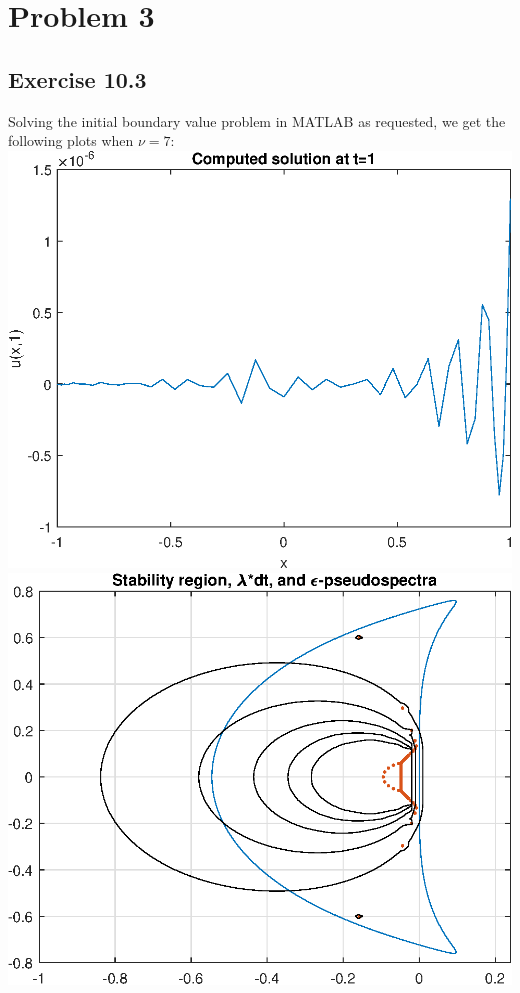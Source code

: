 \documentclass{article}
\begin{document}
\section{Problem 3}
\subsection{Exercise 10.3}
Solving the initial boundary value problem in MATLAB as requested, we get the following plots when $\nu=7$:\\
\includegraphics[scale=0.8]{sol7.eps}\\
\includegraphics[scale=0.8]{reg7.eps}\\
\end{document}
